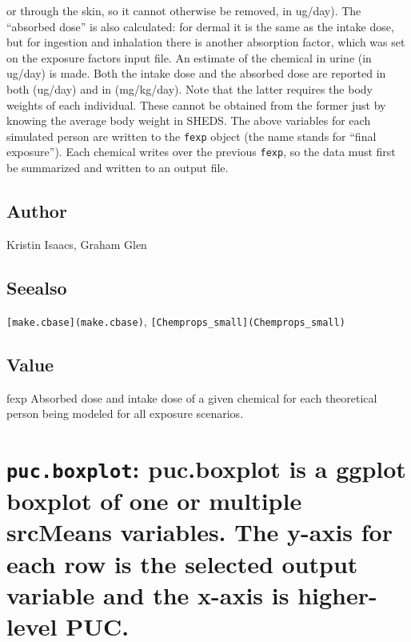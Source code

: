 \documentclass[
]{article}
\begin{document}
or through the skin, so it cannot otherwise be removed, in ug/day). The
``absorbed dose'' is also calculated: for dermal it is the same as the
intake dose, but for ingestion and inhalation there is another
absorption factor, which was set on the exposure factors input file. An
estimate of the chemical in urine (in ug/day) is made. Both the intake
dose and the absorbed dose are reported in both (ug/day) and in
(mg/kg/day). Note that the latter requires the body weights of each
individual. These cannot be obtained from the former just by knowing the
average body weight in SHEDS. The above variables for each simulated
person are written to the \texttt{fexp} object (the name stands for
``final exposure''). Each chemical writes over the previous
\texttt{fexp}, so the data must first be summarized and written to an
output file.

\hypertarget{author-25}{%
\subsection{Author}\label{author-25}}

Kristin Isaacs, Graham Glen

\hypertarget{seealso-20}{%
\subsection{Seealso}\label{seealso-20}}

\texttt{{[}make.cbase{]}(make.cbase)},
\texttt{{[}Chemprops\_small{]}(Chemprops\_small)}

\hypertarget{value-26}{%
\subsection{Value}\label{value-26}}

fexp Absorbed dose and intake dose of a given chemical for each
theoretical person being modeled for all exposure scenarios.

\hypertarget{puc.boxplot-puc.boxplot-is-a-ggplot-boxplot-of-one-or-multiple-srcmeans-variables.-the-y-axis-for-each-row-is-the-selected-output-variable-and-the-x-axis-is-higher-level-puc.}{%
\section{\texorpdfstring{\texttt{puc.boxplot}: puc.boxplot is a ggplot
boxplot of one or multiple srcMeans variables. The y-axis for each row
is the selected output variable and the x-axis is higher-level
PUC.}{puc.boxplot: puc.boxplot is a ggplot boxplot of one or multiple srcMeans variables. The y-axis for each row is the selected output variable and the x-axis is higher-level PUC.}}\label{puc.boxplot-puc.boxplot-is-a-ggplot-boxplot-of-one-or-multiple-srcmeans-variables.-the-y-axis-for-each-row-is-the-selected-output-variable-and-the-x-axis-is-higher-level-puc.}}
\end{document}
